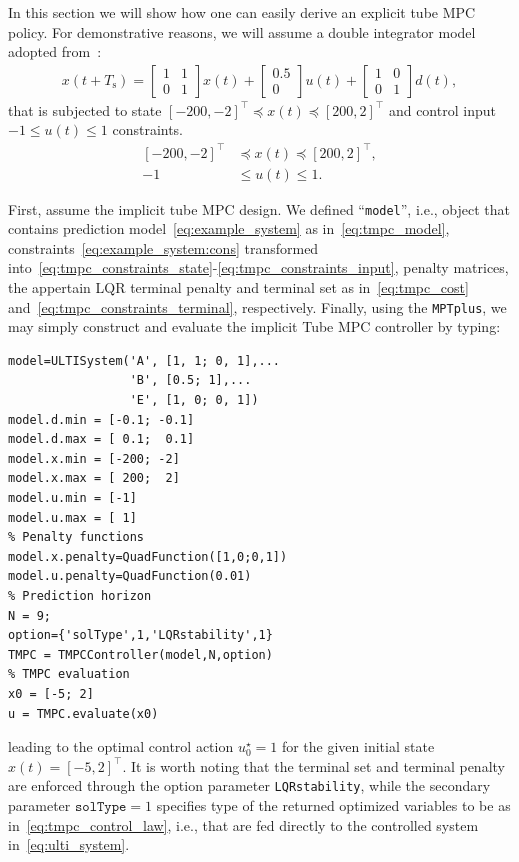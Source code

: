 \documentclass[letterpaper, 10 pt, conference]{ieeeconf}
\begin{document}
In this section we will show how one can easily derive an explicit tube MPC policy. For demonstrative reasons, we will assume a double integrator model adopted from~\cite{MS05}:
\begin{eqnarray}
	\label{eq:example_system}
	x(t+T_\text{s}) = 
	\begin{bmatrix}
		1 & 1 \\
		0 & 1 
	\end{bmatrix} 
	x(t) + 
	\begin{bmatrix}
		0.5 \\
		0  
	\end{bmatrix}
	u(t) + 
	\begin{bmatrix}
		1 & 0 \\
		0 & 1 
	\end{bmatrix}
	d(t) ,
\end{eqnarray}
that is subjected to state $[-200, -2]^{\top} \preceq x(t) \preceq [200, 2]^{\top}$ and control input $-1 \leq u(t) \leq 1$ constraints.
\begin{subequations}
	\label{eq:example_system:cons}
	\begin{align}
		[-200, -2]^{\top} &\preceq x(t) \preceq [200, 2]^{\top}, \\
		-1 &\leq u(t) \leq 1.
	\end{align}
\end{subequations}



First, assume the implicit tube MPC design. We defined ``\verb|model|'', i.e., object that contains prediction model~\eqref{eq:example_system} as in~\eqref{eq:tmpc_model}, constraints~\eqref{eq:example_system:cons} transformed into~\eqref{eq:tmpc_constraints_state}-\eqref{eq:tmpc_constraints_input}, penalty matrices, the appertain LQR terminal penalty and terminal set as in~\eqref{eq:tmpc_cost} and~\eqref{eq:tmpc_constraints_terminal}, respectively. 
Finally, using the \texttt{MPTplus}, we may simply construct and evaluate the implicit Tube MPC controller by typing:
\begin{verbatim}
model=ULTISystem('A', [1, 1; 0, 1],...
                 'B', [0.5; 1],...
                 'E', [1, 0; 0, 1])
model.d.min = [-0.1; -0.1] 
model.d.max = [ 0.1;  0.1]
model.x.min = [-200; -2]
model.x.max = [ 200;  2]
model.u.min = [-1]
model.u.max = [ 1]
% Penalty functions
model.x.penalty=QuadFunction([1,0;0,1])
model.u.penalty=QuadFunction(0.01)
% Prediction horizon
N = 9;
option={'solType',1,'LQRstability',1}
TMPC = TMPCController(model,N,option)
% TMPC evaluation
x0 = [-5; 2]
u = TMPC.evaluate(x0)
\end{verbatim}
leading to the optimal control action $u_{0}^{\star} = 1$ for the given initial state $x(t) = [-5, 2]^\top$.
It is worth noting that the terminal set and terminal penalty are enforced through the option parameter \texttt{LQRstability}, while the secondary parameter $\texttt{solType} = 1$ specifies type of the returned optimized variables to be as in~\eqref{eq:tmpc_control_law}, i.e., that are fed directly to the controlled system in~\eqref{eq:ulti_system}.
\end{document}
